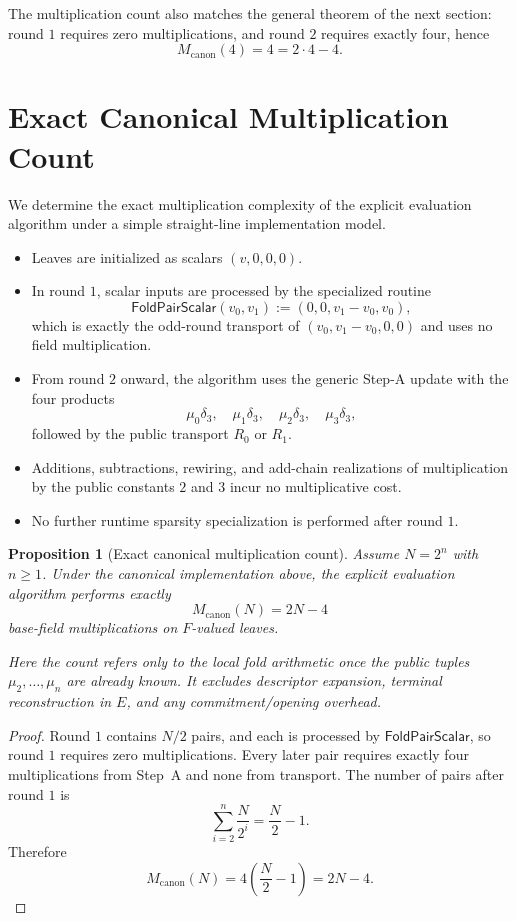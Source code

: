 \documentclass[11pt]{article}
\newtheorem{proposition}[theorem]{Proposition}
\begin{document}
The multiplication count also matches the general theorem of the next section: round \(1\) requires zero multiplications, and round \(2\) requires exactly four, hence
\[
M_{\mathrm{canon}}(4)=4=2\cdot 4-4.
\]

\section{Exact Canonical Multiplication Count}

We determine the exact multiplication complexity of the explicit evaluation algorithm under a simple straight-line implementation model.
\begin{itemize}[leftmargin=1.5em]
\item Leaves are initialized as scalars \((v,0,0,0)\).
\item In round \(1\), scalar inputs are processed by the specialized routine
  \[
  \mathsf{FoldPairScalar}(v_0,v_1):=(0,0,v_1-v_0,v_0),
  \]
  which is exactly the odd-round transport of \((v_0,v_1-v_0,0,0)\) and uses no field multiplication.
\item From round \(2\) onward, the algorithm uses the generic Step-A update with the four products
  \[
  \mu_0\delta_3,\quad \mu_1\delta_3,\quad \mu_2\delta_3,\quad \mu_3\delta_3,
  \]
  followed by the public transport \(R_0\) or \(R_1\).
\item Additions, subtractions, rewiring, and add-chain realizations of multiplication by the public constants \(2\) and \(3\) incur no multiplicative cost.
\item No further runtime sparsity specialization is performed after round \(1\).
\end{itemize}

\begin{proposition}[Exact canonical multiplication count]
\label{prop:canon}
Assume \(N=2^n\) with \(n\ge 1\). Under the canonical implementation above, the explicit evaluation algorithm performs exactly
\[
M_{\mathrm{canon}}(N)=2N-4
\]
base-field multiplications on \(F\)-valued leaves.

Here the count refers only to the local fold arithmetic once the public tuples \(\mu_2,\dots,\mu_n\) are already known. It excludes descriptor expansion, terminal reconstruction in \(E\), and any commitment/opening overhead.
\end{proposition}

\begin{proof}
Round \(1\) contains \(N/2\) pairs, and each is processed by \(\mathsf{FoldPairScalar}\), so round \(1\) requires zero multiplications. Every later pair requires exactly four multiplications from Step~A and none from transport. The number of pairs after round \(1\) is
\[
\sum_{i=2}^{n}\frac{N}{2^i}=\frac{N}{2}-1.
\]
Therefore
\[
M_{\mathrm{canon}}(N)=4\left(\frac{N}{2}-1\right)=2N-4.
\]
\end{proof}
\end{document}
